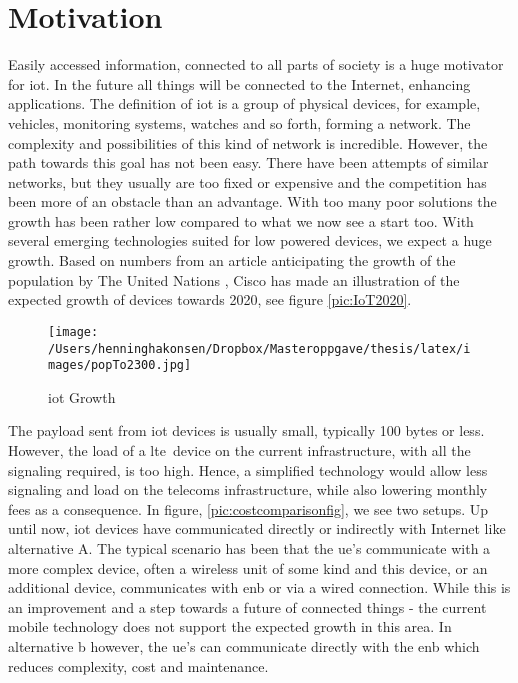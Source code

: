 \documentclass[USenglish]{ifimaster}  %
\begin{document}
\section{Motivation}
Easily accessed information, connected to all parts of society is a huge motivator for \acrfull{iot}. In the future all things will be connected to the Internet, enhancing applications. The definition of \acrshort{iot} is a group of physical devices, for example, vehicles, monitoring systems, watches and so forth, forming a network. The complexity and possibilities of this kind of network is incredible. However, the path towards this goal has not been easy. There have been attempts of similar networks, but they usually are too fixed or expensive and the competition has been more of an obstacle than an advantage. With too many poor solutions the growth has been rather low compared to what we now see a start too. With several emerging technologies suited for low powered devices, we expect a huge growth. Based on numbers from an article anticipating the growth of the population by The United Nations \cite{online:pop2300}, Cisco has made an illustration of the expected growth of devices towards 2020, see figure \vref{pic:IoT2020}.

\begin{figure}[ht]
  \centering\texttt{[image: /Users/henninghakonsen/Dropbox/Masteroppgave/thesis/latex/images/popTo2300.jpg]}
  \caption[\acrshort{iot} Growth]{\acrshort{iot} Growth \cite{online:IoT2020}}
  \label{pic:IoT2020}
\end{figure}

The payload sent from \acrshort{iot} devices is usually small, typically 100 bytes or less. However, the load of a \acrfull{lte} device on the current infrastructure, with all the signaling required, is too high. Hence, a simplified technology would allow less signaling and load on the telecoms infrastructure, while also lowering monthly fees as a consequence. In figure, \vref{pic:costcomparisonfig}, we see two setups. Up until now, \acrshort{iot} devices have communicated directly or indirectly with Internet like alternative A. The typical scenario has been that the \acrfull{ue}'s communicate with a more complex device, often a wireless unit of some kind and this device, or an additional device, communicates with \acrfull{enb} or via a wired connection. While this is an improvement and a step towards a future of connected things - the current mobile technology does not support the expected growth in this area. In alternative b however, the \acrshort{ue}'s can communicate directly with the \acrshort{enb} which reduces complexity, cost and maintenance.
\end{document}
